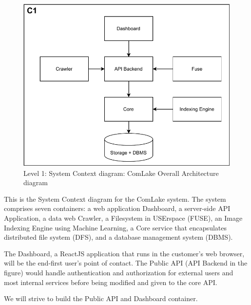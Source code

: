 \begin{figure}[H]
    \centering
    \includegraphics[width=1.0\textwidth, page={1}]{images/ComLake_arch.pdf}
    \caption{Level 1: System Context diagram: ComLake Overall Architecture diagram}
    \label{fig:C1}
\end{figure}
This is the System Context diagram for the ComLake system. The system comprises seven containers: a web application Dashboard, a server-side API Application, a data web Crawler, a Filesystem in USErspace (FUSE), an Image Indexing Engine using Machine Learning, a Core service that encapsulates distributed file system (DFS), and a database management system (DBMS).

The Dashboard, a ReactJS application that runs in the customer's web browser, will be the end-first user's point of contact. The Public API (API Backend in the figure) would handle authentication and authorization for external users and most internal services before being modified and given to the core API.

We will strive to build the Public API and Dashboard container. 

